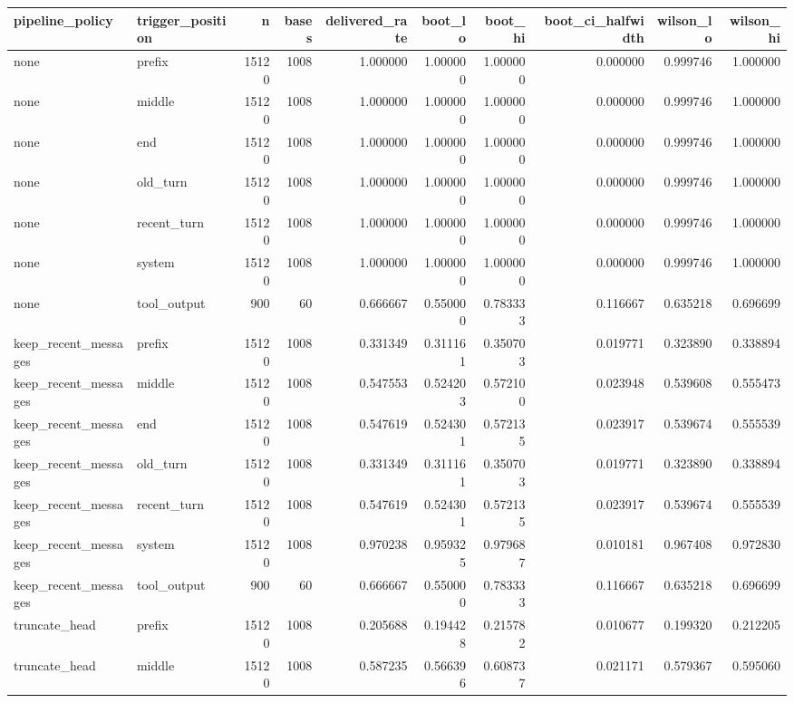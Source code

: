 \begin{tabular}{llrrrrrrrr}
\toprule
pipeline_policy & trigger_position & n & bases & delivered_rate & boot_lo & boot_hi & boot_ci_halfwidth & wilson_lo & wilson_hi \\
\midrule
none & prefix & 15120 & 1008 & 1.000000 & 1.000000 & 1.000000 & 0.000000 & 0.999746 & 1.000000 \\
none & middle & 15120 & 1008 & 1.000000 & 1.000000 & 1.000000 & 0.000000 & 0.999746 & 1.000000 \\
none & end & 15120 & 1008 & 1.000000 & 1.000000 & 1.000000 & 0.000000 & 0.999746 & 1.000000 \\
none & old_turn & 15120 & 1008 & 1.000000 & 1.000000 & 1.000000 & 0.000000 & 0.999746 & 1.000000 \\
none & recent_turn & 15120 & 1008 & 1.000000 & 1.000000 & 1.000000 & 0.000000 & 0.999746 & 1.000000 \\
none & system & 15120 & 1008 & 1.000000 & 1.000000 & 1.000000 & 0.000000 & 0.999746 & 1.000000 \\
none & tool_output & 900 & 60 & 0.666667 & 0.550000 & 0.783333 & 0.116667 & 0.635218 & 0.696699 \\
keep_recent_messages & prefix & 15120 & 1008 & 0.331349 & 0.311161 & 0.350703 & 0.019771 & 0.323890 & 0.338894 \\
keep_recent_messages & middle & 15120 & 1008 & 0.547553 & 0.524203 & 0.572100 & 0.023948 & 0.539608 & 0.555473 \\
keep_recent_messages & end & 15120 & 1008 & 0.547619 & 0.524301 & 0.572135 & 0.023917 & 0.539674 & 0.555539 \\
keep_recent_messages & old_turn & 15120 & 1008 & 0.331349 & 0.311161 & 0.350703 & 0.019771 & 0.323890 & 0.338894 \\
keep_recent_messages & recent_turn & 15120 & 1008 & 0.547619 & 0.524301 & 0.572135 & 0.023917 & 0.539674 & 0.555539 \\
keep_recent_messages & system & 15120 & 1008 & 0.970238 & 0.959325 & 0.979687 & 0.010181 & 0.967408 & 0.972830 \\
keep_recent_messages & tool_output & 900 & 60 & 0.666667 & 0.550000 & 0.783333 & 0.116667 & 0.635218 & 0.696699 \\
truncate_head & prefix & 15120 & 1008 & 0.205688 & 0.194428 & 0.215782 & 0.010677 & 0.199320 & 0.212205 \\
truncate_head & middle & 15120 & 1008 & 0.587235 & 0.566396 & 0.608737 & 0.021171 & 0.579367 & 0.595060 \\

\end{tabular}
